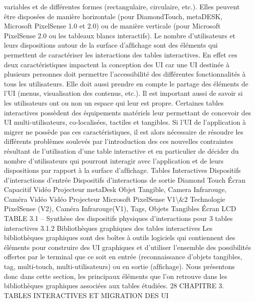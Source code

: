 \documentclass{article}
\begin{document}
variables et de diff\'{e}rentes formes (rectangulaire, circulaire, etc.). Elles peuvent \^{e}tre dispos\'{e}es de mani\`{e}re horizontale (pour DiamondTouch, metaDESK, Microsoft PixelSense 1.0 et 2.0) ou de mani\`{e}re
verticale (pour Microsoft PixelSense 2.0 ou les tableaux blancs interactifs).
Le nombre d’utilisateurs et leurs dispositions autour de la surface d’afﬁchage sont des \'{e}l\'{e}ments
qui permettent de caract\'{e}riser les interactions des tables interactives. En effet ces deux caract\'{e}ristiques
impactent la conception des UI car une UI destin\'{e}e \`{a} plusieurs personnes doit permettre l’accessibilit\'{e}
des diff\'{e}rentes fonctionnalit\'{e}s \`{a} tous les utilisateurs. Elle doit aussi prendre en compte le partage
des \'{e}l\'{e}ments de l’UI (menus, visualisation des contenus, etc.). Il est important aussi de savoir si les
utilisateurs ont ou non un espace qui leur est propre.
Certaines tables interactives poss\`{e}dent des \'{e}quipements mat\'{e}riels leur permettant de concevoir
des UI multi-utilisateurs, co-localis\'{e}es, tactiles et tangibles. Si l’UI de l’application \`{a} migrer ne poss\`{e}de pas ces caract\'{e}ristiques, il est alors n\'{e}cessaire de r\'{e}soudre les diff\'{e}rents probl\`{e}mes soulev\'{e}s
par l’introduction des ces nouvelles contraintes r\'{e}sultant de l’utilisation d’une table interactive et en
particulier de d\'{e}cider du nombre d’utilisateurs qui pourront interagir avec l’application et de leurs
dispositions par rapport \`{a} la surface d’afﬁchage.
Tables Interactives
Dispositifs d’interactions
d’entr\'{e}e
Dispositifs d’interactions de
sortie
Diamond Touch
Écran Capacitif
Vid\'{e}o Projecteur
metaDesk
Objet Tangible, Camera
Infrarouge, Cam\'{e}ra Vid\'{e}o
Vid\'{e}o Projecteur
Microsoft PixelSense V1\textbackslash{}&2
Technologie PixelSense (V2),
Cam\'{e}ra Infrarouge(V1), Tags,
Objets Tangibles
Écran LCD
TABLE 3.1 – Synth\`{e}se des dispositifs physiques d’interactions pour 3 tables interactives
3.1.2
Biblioth\`{e}ques graphiques des tables interactives
Les biblioth\`{e}ques graphiques sont des bo\^{i}tes \`{a} outils logiciels qui contiennent des \'{e}l\'{e}ments pour
construire des UI graphiques et d’utiliser l’ensemble des possibilit\'{e}s offertes par le terminal que ce
soit en entr\'{e}e (reconnaissance d’objets tangibles, tag, multi-touch, multi-utilisateurs) ou en sortie
(afﬁchage). Nous pr\'{e}sentons donc dans cette section, les principaux \'{e}l\'{e}ments que l’on retrouve dans
les biblioth\`{e}ques graphiques associ\'{e}es aux tables \'{e}tudi\'{e}es.
28
CHAPITRE 3. TABLES INTERACTIVES ET MIGRATION DES UI
\end{document}

